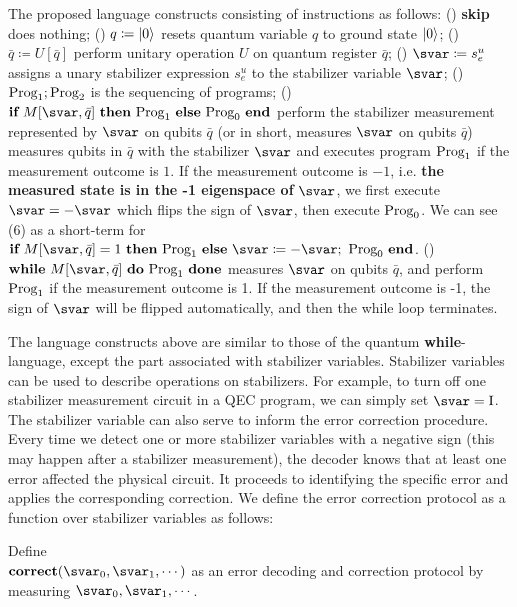 \setcounter{cnt}{0}
The proposed language constructs consisting of instructions as follows: 
(\showcnt)  \textbf{skip} does nothing; 
(\showcnt) $q \coloneqq \vert 0 \rangle$ resets quantum variable $q$ to ground state $\vert 0 \rangle$; 
(\showcnt) $\bar{q} \coloneqq U[\bar{q}]$ perform unitary operation $U$ on quantum register $\bar{q}$; 
(\showcnt) $\svar \coloneqq s_e^u$ assigns a unary stabilizer expression $s_e^u$ to the stabilizer variable $\svar$;
(\showcnt) $\text{Prog}_1;\text{Prog}_2$ is the sequencing of programs; 
(\showcnt) $\textbf{if}\ M[\svar,\bar{q}]\ \textbf{then}\  \prog_1\ \textbf{else}\ \prog_0\ \textbf{end}$ perform the stabilizer measurement represented by $\svar$ on qubits $\bar{q}$ (or in short, measures $\svar$ on qubits $\bar{q}$)
measures qubits in $\bar{q}$ with the stabilizer $\svar$ and executes program $\text{Prog}_1$ if the measurement outcome is $1$. If the measurement outcome is $-1$, i.e. \textbf{the measured state is in the -1 eigenspace of} $\svar$, we first execute $\svar=-\svar$ which flips the sign of $\svar$, then execute $\text{Prog}_0$. 
We can see (6) as a short-term for $\textbf{if}\ M[\svar,\bar{q}]=1\ \textbf{then}\ \prog_1\ \textbf{else}\ \svar \coloneqq -\svar ;\ \prog_0\ \textbf{end}$.
(\showcnt) $\textbf{while}\  M[\svar,\bar{q}]\ \textbf{do}\ \prog_1\ \textbf{done}$ measures $\svar$ on qubits $\bar{q}$, and perform $\text{Prog}_1$ if the measurement outcome is 1. If the measurement outcome is -1, the sign of $\svar$ will be flipped automatically, and then the while loop terminates. 


The language constructs above are similar to those of the quantum \textbf{while}-language, except the part associated with stabilizer variables. Stabilizer variables can be used to describe operations on stabilizers.
For example, to turn off one stabilizer measurement circuit in a QEC program, we can simply set $\svar = {\rm I}$. The stabilizer variable can also serve to inform the error correction procedure. Every time we detect one or more stabilizer variables with a negative sign (this may happen after a stabilizer measurement), 
the decoder knows that at least one error affected the physical circuit. It proceeds to identifying the specific error and applies the corresponding correction. We define the error correction protocol as a function over stabilizer variables as follows:
\begin{definition} Define \\
$\textbf{correct}(\svar_0,\svar_1,\cdots)$ as an error decoding and correction protocol by measuring $\svar_0,\svar_1,\cdots$.
\end{definition}

